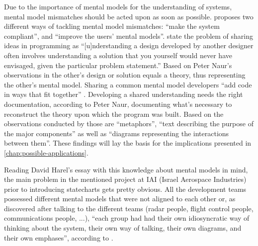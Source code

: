 Due to the importance of mental models for the understanding of systems, mental model mismatches should be acted upon as soon as possible.
\textcite{nielsen_mental_2010} proposes two different ways of tackling mental model mismatches: ``make the system compliant'', and ``improve the users' mental models''.
\textcite{kitchenham_research_1990} state the problem of sharing ideas in programming as ``[u]nderstanding a design developed by another designer often involves understanding a solution that you yourself would never have envisaged, given the particular problem statement.''
Based on Peter Naur's observations in  the other's design or solution equals a theory, thus representing the other's mental model.
Sharing a common mental model developers ``add code in ways that fit together'' \autocite[239]{naur_programming_1985}.
Developing a shared understanding needs the right documentation, according to Peter Naur, documenting what's necessary to reconstruct the theory upon which the program was built.
Based on the observations conducted by \textcite[240]{naur_programming_1985} those are ``metaphors'', ``text describing the purpose of the major components'' as well as ``diagrams representing the interactions between them''.
These findings will lay the basis for the implications presented in \cref{chap:possible-applications}.

Reading David Harel's essay  with this knowledge about mental models in mind, the main problem in the mentioned project at IAI (Israel Aerospace Industries) prior to introducing statecharts gets pretty obvious.
All the development teams possessed different mental models that were not aligned to each other or, as \citeauthor{harel_statecharts_2007} discovered after talking to the different teams (radar people, flight control people, communications people, ...), ``each group had had their own idiosyncratic way of thinking about the system, their own way of talking, their own diagrams, and their own emphases'', according to \textcite{harel_statecharts_2007}.




